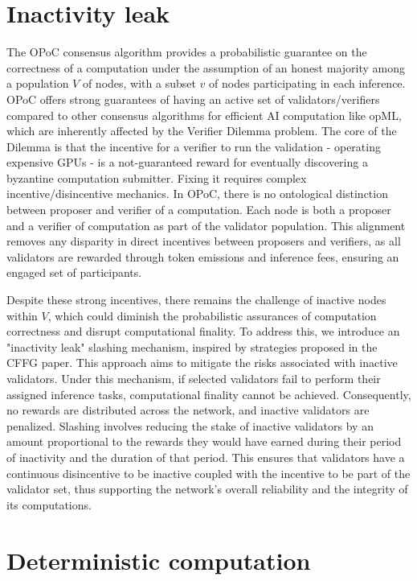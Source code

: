 \documentclass{article}
\begin{document}
\section{Inactivity leak}


The OPoC consensus algorithm provides a probabilistic guarantee on the correctness of a computation under the assumption of an honest majority among a population \( V \) of nodes, with a subset \( v \) of nodes participating in each inference.
OPoC offers strong guarantees of having an active set of validators/verifiers compared to other consensus algorithms for efficient AI computation like opML, which are inherently affected by the Verifier Dilemma problem.  The core of the Dilemma is that the incentive for a verifier to run the validation - operating expensive GPUs - is a not-guaranteed reward for eventually discovering a byzantine computation submitter. Fixing it requires complex incentive/disincentive mechanics. In OPoC, there is no ontological distinction between proposer and verifier of a computation. Each node is both a proposer and a verifier of computation as part of the validator population. This alignment removes any disparity in direct incentives between proposers and verifiers, as all validators are rewarded through token emissions and inference fees, ensuring an engaged set of participants.

Despite these strong incentives, there remains the challenge of inactive nodes within \( V \), which could diminish the probabilistic assurances of computation correctness and disrupt computational finality. To address this, we introduce an "inactivity leak" slashing mechanism, inspired by strategies proposed in the CFFG paper. This approach aims to mitigate the risks associated with inactive validators.
Under this mechanism, if selected validators fail to perform their assigned inference tasks, computational finality cannot be achieved. Consequently, no rewards are distributed across the network, and inactive validators are penalized. Slashing involves reducing the stake of inactive validators by an amount proportional to the rewards they would have earned during their period of inactivity and the duration of that period. This ensures that validators have a continuous disincentive to be inactive coupled with the incentive to be part of the validator set, thus supporting the network's overall reliability and the integrity of its computations.


\section{Deterministic computation} 
\end{document}
